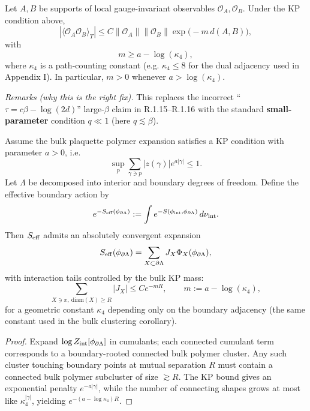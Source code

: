 \begin{theorem}
\begin{corollary}
\label{thm:truncated-decay}
Let $A,B$ be supports of local gauge-invariant observables $\mathcal{O}_A,\mathcal{O}_B$. Under the KP condition above,
\[
|\langle \mathcal{O}_A \mathcal{O}_B\rangle_T| \le C \|\mathcal{O}_A\| \|\mathcal{O}_B\| \exp\big(-m\,d(A,B)\big),
\]
with
\[
m \ge a-\log(\kappa_4),
\]
where $\kappa_4$ is a path-counting constant (e.g. $\kappa_4\le 8$ for the dual adjacency used in Appendix I).
In particular, $m>0$ whenever $a>\log(\kappa_4)$.
\end{corollary}

\textit{Remarks (why this is the right fix).}
This replaces the incorrect ``$\tau=c\beta-\log(2d)$'' large-$\beta$ claim in R.1.15–R.1.16 with the standard \textbf{small-parameter} condition $q\ll1$ (here $q\lesssim \beta$).

\begin{theorem}
\label{thm:boundary-decay-hard}
Assume the bulk plaquette polymer expansion satisfies a KP condition with parameter $a>0$, i.e.
\[
\sup_{p}\sum_{\gamma\ni p} |z(\gamma)|e^{a|\gamma|}\le 1.
\]
Let $\Lambda$ be decomposed into interior and boundary degrees of freedom. Define the effective boundary action by
\[
e^{-S_{\rm eff}(\phi_{\partial\Lambda})}
:=\int e^{-S(\phi_{\rm int},\phi_{\partial\Lambda})}\,d\nu_{\rm int}.
\]
Then $S_{\rm eff}$ admits an absolutely convergent expansion
\[
S_{\rm eff}(\phi_{\partial\Lambda})=\sum_{X\subset\partial\Lambda} J_X \Phi_X(\phi_{\partial\Lambda}),
\]
with interaction tails controlled by the bulk KP mass:
\[
\sum_{X\ni x,\ \mathrm{diam}(X)\ge R} |J_X|
\le C e^{-mR},
\qquad m:=a-\log(\kappa_4),
\]
for a geometric constant $\kappa_4$ depending only on the boundary adjacency (the same constant used in the bulk clustering corollary).
\end{theorem}

\begin{proof}
Expand $\log Z_{\rm int}[\phi_{\partial\Lambda}]$ in cumulants; each connected cumulant term corresponds to a boundary-rooted connected bulk polymer cluster. Any such cluster touching boundary points at mutual separation $R$ must contain a connected bulk polymer subcluster of size $\gtrsim R$. The KP bound gives an exponential penalty $e^{-a|\gamma|}$, while the number of connecting shapes grows at most like $\kappa_4^{|\gamma|}$, yielding $e^{-(a-\log\kappa_4)R}$.
\end{proof}


\end{theorem}
